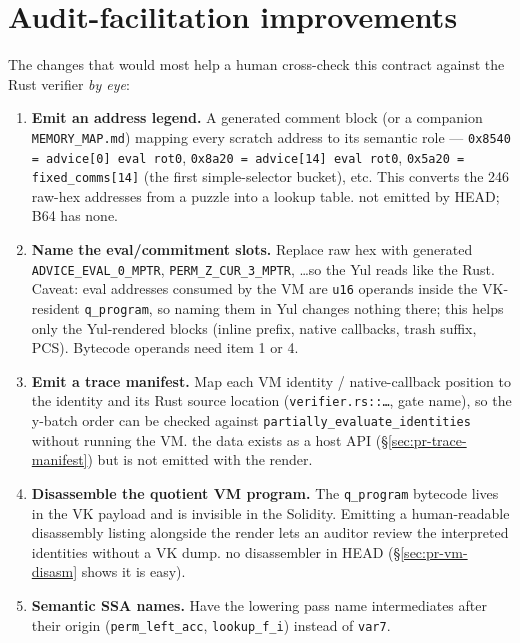 \section{Audit-facilitation improvements}
\label{sec:pr-audit}

The changes that would most help a human cross-check this contract
against the Rust verifier \emph{by eye}:

\begin{enumerate}
  \item \textcolor{codegenblue}{\textbf{Emit an address legend.}} A
        generated comment block (or a companion
        \texttt{MEMORY\_MAP.md}) mapping every scratch address to its
        semantic role --- \texttt{0x8540 = advice[0] eval rot0},
        \texttt{0x8a20 = advice[14] eval rot0},
        \texttt{0x5a20 = fixed\_\allowbreak{}comms[14]} (the first simple-selector
        bucket), etc. This converts the 246
        raw-hex addresses from a puzzle into a lookup table.
         not emitted by HEAD; B64 has none.
  \item \textcolor{codegenblue}{\textbf{Name the eval/commitment slots.}}
        Replace raw hex with generated
        \texttt{ADVICE\_\allowbreak{}EVAL\_\allowbreak{}0\_\allowbreak{}MPTR},
        \texttt{PERM\_\allowbreak{}Z\_\allowbreak{}CUR\_\allowbreak{}3\_\allowbreak{}MPTR}, \ldots so the Yul reads like
        the Rust.  Caveat: eval addresses consumed by the
        VM are \texttt{u16} operands inside the VK-resident
        \texttt{q\_program}, so naming them in Yul changes nothing there;
        this helps only the Yul-rendered blocks (inline prefix, native
        callbacks, trash suffix, PCS). Bytecode operands need item 1 or 4.
  \item \textcolor{codegenblue}{\textbf{Emit a trace manifest.}} Map
        each VM identity / native-callback position to the identity and
        its Rust source location
        (\texttt{verifier.rs::\ldots}, gate name), so the y-batch order
        can be checked against \texttt{partially\_\allowbreak{}evaluate\_\allowbreak{}identities}
        without running the VM.  the data exists as a
        host API (\S\ref{sec:pr-trace-manifest}) but is not emitted with
        the render.
  \item \textcolor{codegenblue}{\textbf{Disassemble the quotient VM
        program.}} The \texttt{q\_program} bytecode lives in the VK
        payload and is invisible in the Solidity. Emitting a
        human-readable disassembly listing alongside the render lets an
        auditor review the interpreted identities without a VK dump.
         no disassembler in HEAD
        (\S\ref{sec:pr-vm-disasm} shows it is easy).
  \item \textcolor{codegenblue}{\textbf{Semantic SSA names.}} Have the
        lowering pass name intermediates after their origin
        (\texttt{perm\_left\_acc}, \texttt{lookup\_f\_i}) instead of
        \texttt{var7}. 
\end{enumerate}


